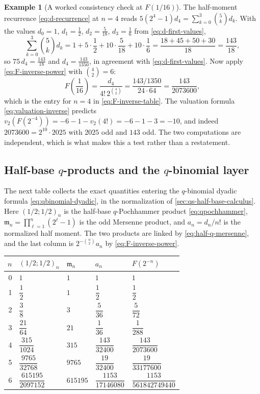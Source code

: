 \documentclass[11pt,oneside]{article}
\theoremstyle{definition}
\newtheorem{example}[theorem]{Example}
\theoremstyle{remark}
\newcommand{\vtwo}{v_2}
\begin{document}
\begin{example}[A worked consistency check at $F(1/16)$]    \label{ex:mom-f16-check}
The half-moment recurrence \eqref{eq:d-recurrence} at $n=4$ reads
$5(2^4-1)d_4=\sum_{k=0}^{3}\binom5kd_k$.  With the values $d_0=1$, $d_1=\tfrac12$,
$d_2=\tfrac5{18}$, $d_3=\tfrac16$ from \eqref{eq:d-first-values},
\begin{equation*}
 \sum_{k=0}^{3}\binom5kd_k
 =1+5\cdot\frac12+10\cdot\frac5{18}+10\cdot\frac16
 =\frac{18+45+50+30}{18}
 =\frac{143}{18},
\end{equation*}
so $75\,d_4=\tfrac{143}{18}$ and $d_4=\tfrac{143}{1350}$, in agreement with
\eqref{eq:d-first-values}.  Now apply \eqref{eq:F-inverse-power} with $\binom42=6$:
\begin{equation*}
 F\!\left(\frac1{16}\right)=\frac{d_4}{4!\,2^{\binom42}}
 =\frac{143/1350}{24\cdot64}
 =\frac{143}{2073600},
\end{equation*}
which is the entry for $n=4$ in \eqref{eq:F-inverse-table}.  The valuation formula
\eqref{eq:valuation-inverse} predicts
$\vtwo(F(2^{-4}))=-6-1-\vtwo(4!)=-6-1-3=-10$, and indeed
$2073600=2^{10}\cdot2025$ with $2025$ odd and $143$ odd.  The two computations are
independent, which is what makes this a test rather than a restatement.
\end{example}

\subsection{Half-base $q$-products and the $q$-binomial layer}
\label{subsec:qs-data}

The next table collects the exact quantities entering the $q$-binomial dyadic formula
\eqref{eq:qbinomial-dyadic}, in the normalization of
\cref{sec:qs-half-base-calculus}.  Here $(1/2;1/2)_n$ is the half-base $q$-Pochhammer product
\eqref{eq:qpochhammer}, $\mathfrak m_n=\prod_{\ell=1}^{n}(2^\ell-1)$ is the odd Mersenne
product, and $a_n=d_n/n!$ is the normalized half moment.  The two products are linked by
\eqref{eq:half-q-mersenne}, and the last column is $2^{-\binom n2}a_n$ by
\eqref{eq:F-inverse-power}.

\begin{longtable}{@{}rllll@{}}
\toprule
$n$ & $(1/2;1/2)_n$ & $\mathfrak m_n$ & $a_n$ & $F(2^{-n})$\\
\midrule
\endhead
0 & $1$ & $1$ & $1$ & $1$\\[0.3ex]
1 & $\dfrac12$ & $1$ & $\dfrac12$ & $\dfrac12$\\[0.8ex]
2 & $\dfrac38$ & $3$ & $\dfrac5{36}$ & $\dfrac5{72}$\\[0.8ex]
3 & $\dfrac{21}{64}$ & $21$ & $\dfrac1{36}$ & $\dfrac1{288}$\\[0.8ex]
4 & $\dfrac{315}{1024}$ & $315$ & $\dfrac{143}{32400}$ & $\dfrac{143}{2073600}$\\[0.8ex]
5 & $\dfrac{9765}{32768}$ & $9765$ & $\dfrac{19}{32400}$ & $\dfrac{19}{33177600}$\\[0.8ex]
6 & $\dfrac{615195}{2097152}$ & $615195$ & $\dfrac{1153}{17146080}$ &
    $\dfrac{1153}{561842749440}$\\
\bottomrule
\end{longtable}
\end{document}

